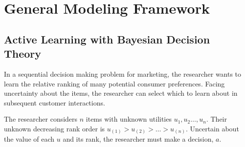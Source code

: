 \documentclass[nonblindrev]{informs3}
\newcommand{\numitems}{n}
\begin{document}










\section{General Modeling Framework}


\subsection{Active Learning with Bayesian Decision Theory}

In a sequential decision making problem for marketing, the researcher wants to learn the relative ranking of many potential consumer preferences. Facing uncertainty about the items, the researcher can select which to learn about in subsequent customer interactions.

The researcher considers $\numitems$ items with unknown utilities $u_1,u_2 \ldots, u_\numitems$. Their unknown decreasing rank order is $u_{(1)} > u_{(2)} > \ldots > u_{(\numitems)}$. Uncertain about the value of each $u$ and its rank, the researcher must make a decision, $a$. 
\end{document}
